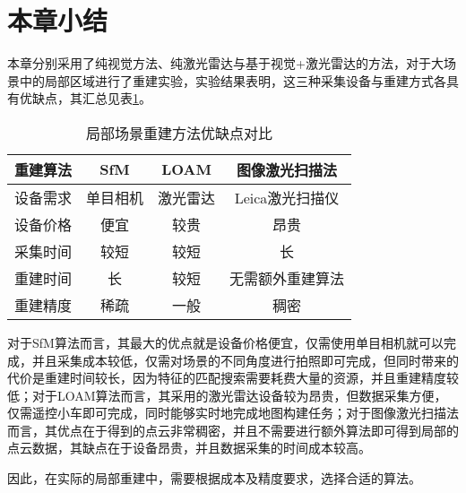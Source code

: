 \section{本章小结}
本章分别采用了纯视觉方法、纯激光雷达与基于视觉+激光雷达的方法，对于大场景中的局部区域进行了重建实验，实验结果表明，这三种采集设备与重建方式各具有优缺点，其汇总见表\ref{method-compare}。
\begin{table}
	\centering
	\caption{局部场景重建方法优缺点对比}
	\begin{tabular}{cccc}
		\toprule
		重建算法 & SfM & LOAM & 图像激光扫描法\\
		\midrule
		设备需求 & 单目相机 & 激光雷达 & Leica激光扫描仪 \\
		设备价格 & 便宜 & 较贵 & 昂贵 \\
		采集时间 & 较短 & 较短 & 长 \\
		重建时间 & 长 & 较短 & 无需额外重建算法 \\
		重建精度 & 稀疏 & 一般 & 稠密 \\
		\bottomrule
	\end{tabular}
	\label{method-compare}
\end{table}

对于SfM算法而言，其最大的优点就是设备价格便宜，仅需使用单目相机就可以完成，并且采集成本较低，仅需对场景的不同角度进行拍照即可完成，但同时带来的代价是重建时间较长，因为特征的匹配搜索需要耗费大量的资源，并且重建精度较低；对于LOAM算法而言，其采用的激光雷达设备较为昂贵，但数据采集方便，仅需遥控小车即可完成，同时能够实时地完成地图构建任务；对于图像激光扫描法而言，其优点在于得到的点云非常稠密，并且不需要进行额外算法即可得到局部的点云数据，其缺点在于设备昂贵，并且数据采集的时间成本较高。

因此，在实际的局部重建中，需要根据成本及精度要求，选择合适的算法。
